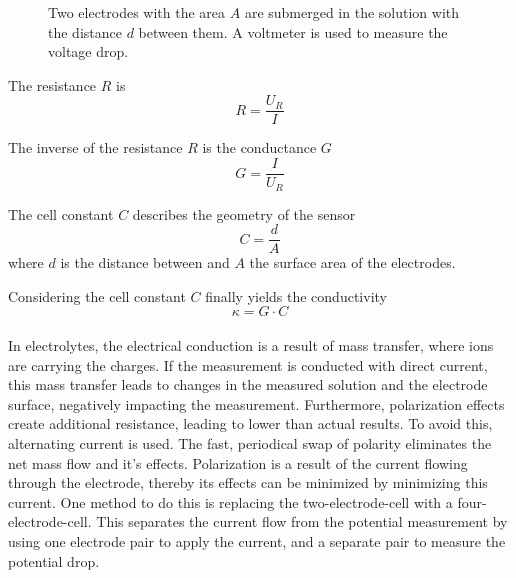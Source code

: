 \begin{figure}
	\begin{center}
    	\tikzset{external/export next=false}
		\caption{Two electrodes with the area $A$ are submerged in the solution with the distance $d$ between them. A voltmeter is used to measure the voltage drop.}
		\label{fig:elec}
	\end{center}
\end{figure}

The resistance $ R $ is
\begin{equation}
	R = \dfrac{U_R}{I}
\label{eq:R}
\end{equation}

The inverse of the resistance $ R $ is the conductance $ G $
\begin{equation}
	G = \dfrac{I}{U_R}
\label{eq:G}
\end{equation}

The cell constant $ C $ describes the geometry of the sensor
\begin{equation}
	C = \dfrac{d}{A}
\label{eq:C}
\end{equation}
where $ d $ is the distance between and $ A $ the surface area of  the electrodes. 

Considering the cell constant $ C $ finally yields the conductivity
\begin{equation}
	\kappa = G \cdot C
\label{eq:kappa} 
\end{equation}
\\

In electrolytes, the electrical conduction is a result of mass transfer, where ions are carrying the charges. If the measurement is conducted with direct current, this mass transfer leads to changes in the measured solution and the electrode surface, negatively impacting the measurement. Furthermore, polarization effects create additional resistance, leading to lower than actual results. To avoid this, alternating current is used. The fast, periodical swap of polarity eliminates the net mass flow and it's effects. Polarization is a result of the current flowing through the electrode, thereby its effects can be minimized by minimizing this current. One method to do this is replacing the two-electrode-cell with a four-electrode-cell.
This separates the current flow from the potential measurement by using one electrode pair to apply the current, and a separate pair to measure the potential drop. \\

